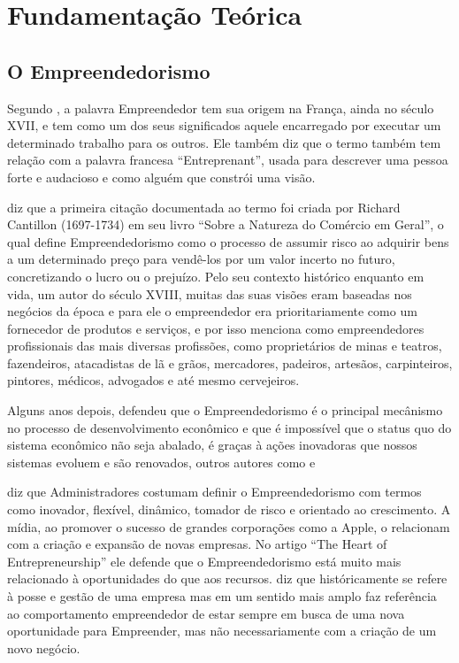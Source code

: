 \chapter[Fundamentação Teórica]{Fundamentação Teórica}
\label{cap-fundamentacao_teorica}

\section{O Empreendedorismo}
\label{section:o_empreendedorismo}

Segundo \cite{McCall2000}, a palavra Empreendedor tem sua origem na França, ainda no século XVII, e tem como um dos seus significados aquele encarregado por executar um determinado trabalho para os outros. Ele também diz que o termo também tem relação com a palavra francesa ``Entreprenant'', usada para descrever uma pessoa forte e audacioso e como alguém que constrói uma visão.

\cite{Brown2013} diz que a primeira citação documentada ao termo foi criada por Richard Cantillon (1697-1734) em seu livro ``Sobre a Natureza do Comércio em Geral'', o qual define Empreendedorismo como o processo de assumir risco ao adquirir bens a um determinado preço para vendê-los por um valor incerto no futuro, concretizando o lucro ou o prejuízo. Pelo seu contexto histórico enquanto em vida, um autor do século XVIII, muitas das suas visões eram baseadas nos negócios da época e para ele o empreendedor era prioritariamente como um fornecedor de produtos e serviços, e por isso menciona como empreendedores profissionais das mais diversas profissões, como proprietários de minas e teatros, fazendeiros, atacadistas de lã e grãos, mercadores, padeiros, artesãos, carpinteiros, pintores, médicos, advogados e até mesmo cervejeiros. 

Alguns anos depois, \cite{Schumpeter1934} defendeu que o Empreendedorismo é o principal mecânismo no processo de desenvolvimento econômico e que é impossível que o status quo do sistema econômico não seja abalado, é graças à ações inovadoras que nossos sistemas evoluem e são renovados, outros autores como \cite{Holcombe1998} e 

\cite{Stevenson1985} diz que Administradores costumam definir o Empreendedorismo com termos como inovador, flexível, dinâmico, tomador de risco e orientado ao crescimento. A mídia, ao promover o sucesso de grandes corporações como a Apple, o relacionam com a criação e expansão de novas empresas. No artigo ``The Heart of Entrepreneurship'' ele defende que o Empreendedorismo está muito mais relacionado à oportunidades do que aos recursos. \cite{Acs2006} diz que históricamente se refere à posse e gestão de uma empresa mas em um sentido mais amplo faz referência ao comportamento empreendedor de estar sempre em busca de uma nova oportunidade para Empreender, mas não necessariamente com a criação de um novo negócio.

